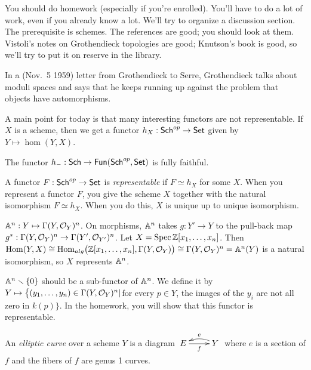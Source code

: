 
You should do homework (especially if you're enrolled). You'll have to do a lot of work, even if you already know a lot. We'll try to organize a discussion section. The prerequisite is schemes. The references are good; you should look at them. Vistoli's notes on Grothendieck topologies are good; Knutson's book is good, so we'll try to put it on reserve in the library.

\bigskip
In a (Nov.~5 1959) letter from Grothendieck to Serre, Grothendieck talks about moduli spaces and says that he keeps running up against the problem that objects have automorphisms.

A main point for today is that many interesting functors are not representable. If $X$ is a scheme, then we get a functor $h_X:\sch^{op}\to \set$ given by $Y\mapsto \hom(Y,X)$.
\begin{lemma}[Yoneda]
  The functor $h_-:\sch\to \fun(\sch^{op},\set)$ is fully faithful.
\end{lemma}
\begin{definition}
  A functor $F:\sch^{op}\to \set$ is \emph{representable} if $F\simeq h_X$ for some $X$.
  When you represent a functor $F$, you give the scheme $X$ together with the natural
  isomorphism $F\simeq h_X$. When you do this, $X$ is unique up to unique isomorphism.
\end{definition}
\begin{example}
  $\AA^n:Y\mapsto \Ga(Y,\O_Y)^n$. On morphisms, $\AA^n$ takes $g:Y'\to Y$ to the
  pull-back map $g^*:\Ga(Y,\O_Y)^n\to \Ga(Y',\O_{Y'})^n$. Let $X=\spec
  \ZZ[x_1,\dots, x_n]$. Then $\hom(Y,X)\cong \hom_{alg}\bigl(\ZZ[x_1,\dots,
  x_n],\Ga(Y,\O_Y)\bigr)\cong \Ga(Y,\O_Y)^n = \AA^n(Y)$ is a natural isomorphism, so
  $X$ represents $\AA^n$.
\end{example}
\begin{example}
  $\AA^n\smallsetminus \{0\}$ should be a sub-functor of $\AA^n$. We define it by
  $Y\mapsto \bigl\{ (y_1,\dots, y_n)\in \Ga(Y,\O_Y)^n|$for every $p\in Y$, the images
  of the $y_i$ are not all zero in $k(p)\bigr\}$. In the homework, you will show that
  this functor is representable.
\end{example}
\begin{definition}
  An \emph{elliptic curve} over a scheme $Y$ is a diagram
  $\xymatrix{E\ar[r]_f & Y\ar@/_/[l]_e}$ where $e$ is a section of $f$ and the
  fibers of $f$ are genus 1 curves.
\end{definition}
